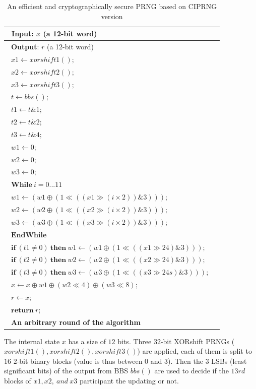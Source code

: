 \begin{table}
\centering
\begin{tabular}{|l|l|}
\hline
~\textbf{Input}: $x$ (a 12-bit word)\\
\hline
~\textbf{Output}: $r$ (a 12-bit word)\\
\hline
~$x1 \leftarrow xorshift1();$\\
~$x2 \leftarrow xorshift2();$\\
~$x3 \leftarrow xorshift3();$\\
~$t \leftarrow bbs();$\\
~$t1 \leftarrow t \& 1;$\\
~$t2 \leftarrow t \& 2;$\\
~$t3 \leftarrow t \& 4;$\\
~$w1 \leftarrow 0;$\\
~$w2 \leftarrow 0;$\\
~$w3 \leftarrow 0;$\\
~$\textbf{While}~ i = 0 ... 11$ \\
~$w1 \leftarrow (w1 \oplus (1 \ll ((x1 \gg (i\times 2))\&3)));$\\
~$w2 \leftarrow (w2 \oplus (1 \ll ((x2 \gg (i\times 2))\&3)));$\\
~$w3 \leftarrow (w3 \oplus (1 \ll ((x3 \gg (i\times 2))\&3)));$\\
~$\textbf{EndWhile}$\\
~$\textbf{if}~(t1 \neq 0)~\textbf{then}~w1 \leftarrow (w1 \oplus (1 \ll ((x1 \gg 24)\&3)));$ \\
~$\textbf{if}~(t2 \neq 0)~\textbf{then}~w2 \leftarrow (w2 \oplus (1 \ll ((x2 \gg 24)\&3)));$ \\
~$\textbf{if}~(t3 \neq 0)~\textbf{then}~w3 \leftarrow (w3 \oplus (1 \ll ((x3 \gg 24s)\&3)));$ \\
~$x \leftarrow x \oplus w1 \oplus (w2 \ll 4) \oplus (w3 \ll 8);$\\
~$r \leftarrow x;$\\
~$\textbf{return} ~r;$\\
\hline
~\textbf{An arbitrary round of the algorithm}~\\
\hline
\end{tabular}
\caption{An efficient and cryptographically secure PRNG based on CIPRNG version}
\label{Version 1 CI cs}
\end{table}

The internal state $x$ has a size of $12$ bits. Three $32$-bit XORshift PRNGs ($xorshift1(), xorshift2(), xorshift3()$) are applied, each of them is split to $16$ $2$-bit binary blocks (value is thus between $0$ and $3$). 
 Then the $3$ LSBs (least significant bits) of the output from BBS $bbs()$ are used to decide if the $13rd$ blocks of $x1,x2, ~and ~x3$ participant the updating or not. 

